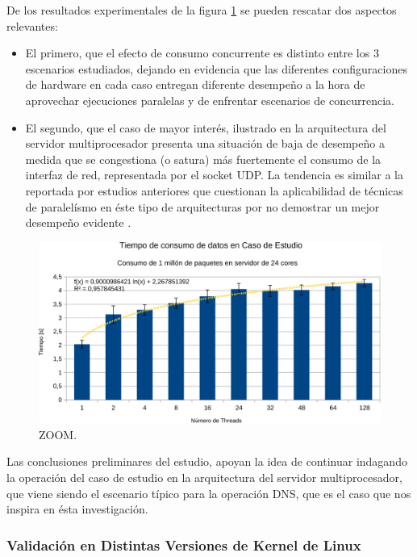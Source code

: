 De los resultados experimentales de la figura \ref{fig:tests_arch} se pueden rescatar dos aspectos relevantes:
\begin{itemize}
\item El primero, que el efecto de consumo concurrente es distinto entre los 3 escenarios estudiados, dejando en evidencia que las diferentes configuraciones de hardware en cada caso entregan diferente desempeño a la hora de aprovechar ejecuciones paralelas y de enfrentar escenarios de concurrencia.
\item El segundo, que el caso de mayor interés, ilustrado en la arquitectura del servidor multiprocesador presenta una situación de baja de desempeño a medida que se congestiona (o satura) más fuertemente el consumo de la interfaz de red, representada por el socket UDP. La tendencia es similar a la reportada por estudios anteriores que cuestionan la aplicabilidad de técnicas de paralelísmo en éste tipo de arquitecturas por no demostrar un mejor desempeño evidente \cite{post:facebook, paper:toshiba, tesis:diegoDCC}.
\end{itemize}

\begin{figure}[h!]
	\centering
	\includegraphics[scale=0.5]{resultados/transferenciaUDP2-crop.pdf}
	\caption{ZOOM.}
	\label{fig:tests_arch}
\end{figure}

Las conclusiones preliminares del estudio, apoyan la idea de continuar indagando la operación del caso de estudio en la arquitectura del servidor multiprocesador, que viene siendo el escenario típico para la operación DNS, que es el caso que nos inspira en ésta investigación.

\subsubsection{Validación en Distintas Versiones de Kernel de Linux}

